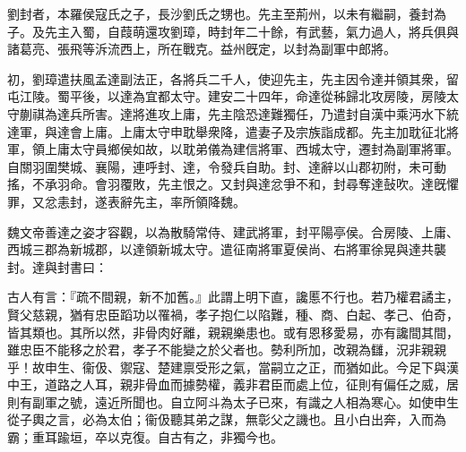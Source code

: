 \begin{pinyinscope}
 
 
 劉封者，本羅侯寇氏之子，長沙劉氏之甥也。先主至荊州，以未有繼嗣，養封為子。及先主入蜀，自葭萌還攻劉璋，時封年二十餘，有武藝，氣力過人，將兵俱與諸葛亮、張飛等泝流西上，所在戰克。益州旣定，以封為副軍中郎將。
 
 
 
 
 初，劉璋遣扶風孟達副法正，各將兵二千人，使迎先主，先主因令達并領其衆，留屯江陵。蜀平後，以達為宜都太守。建安二十四年，命達從秭歸北攻房陵，房陵太守蒯祺為達兵所害。達將進攻上庸，先主陰恐達難獨任，乃遣封自漢中乘沔水下統達軍，與達會上庸。上庸太守申耽舉衆降，遣妻子及宗族詣成都。先主加耽征北將軍，領上庸太守員鄉侯如故，以耽弟儀為建信將軍、西城太守，遷封為副軍將軍。自關羽圍樊城、襄陽，連呼封、達，令發兵自助。封、達辭以山郡初附，未可動搖，不承羽命。會羽覆敗，先主恨之。又封與達忿爭不和，封尋奪達鼔吹。達旣懼罪，又忿恚封，遂表辭先主，率所領降魏。
 
 
 魏文帝善達之姿才容觀，以為散騎常侍、建武將軍，封平陽亭侯。合房陵、上庸、西城三郡為新城郡，以達領新城太守。遣征南將軍夏侯尚、右將軍徐晃與達共襲封。達與封書曰：
 
 
 
 
 古人有言：『疏不間親，新不加舊。』此謂上明下直，讒慝不行也。若乃權君譎主，賢父慈親，猶有忠臣蹈功以罹禍，孝子抱仁以陷難，種、商、白起、孝己、伯奇，皆其類也。其所以然，非骨肉好離，親親樂患也。或有恩移愛易，亦有讒間其間，雖忠臣不能移之於君，孝子不能變之於父者也。勢利所加，改親為讎，況非親親乎！故申生、衞伋、禦寇、楚建禀受形之氣，當嗣立之正，而猶如此。今足下與漢中王，道路之人耳，親非骨血而據勢權，義非君臣而處上位，征則有偏任之威，居則有副軍之號，遠近所聞也。自立阿斗為太子已來，有識之人相為寒心。如使申生從子輿之言，必為太伯；衞伋聽其弟之謀，無彰父之譏也。且小白出奔，入而為霸；重耳踰垣，卒以克復。自古有之，非獨今也。
 

\end{pinyinscope}
